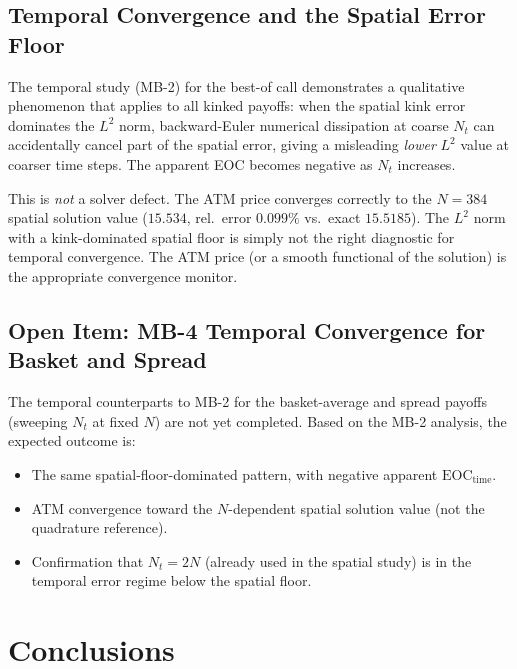 \documentclass[11pt,a4paper]{article}
\newcommand{\eoc}{\mathrm{EOC}}
\begin{document}
\subsection{Temporal Convergence and the Spatial Error Floor}

The temporal study (MB-2) for the best-of call demonstrates a qualitative
phenomenon that applies to all kinked payoffs: when the spatial kink error
dominates the $L^2$ norm, backward-Euler numerical dissipation at coarse
$N_t$ can accidentally cancel part of the spatial error, giving a misleading
\emph{lower} $L^2$ value at coarser time steps.  The apparent EOC becomes
negative as $N_t$ increases.

This is \emph{not} a solver defect.  The ATM price converges correctly to the
$N=384$ spatial solution value ($15.534$, rel.\ error $0.099\%$ vs.\ exact $15.5185$).
The $L^2$ norm with a kink-dominated spatial floor is simply not the right
diagnostic for temporal convergence.  The ATM price (or a smooth functional
of the solution) is the appropriate convergence monitor.

\subsection{Open Item: MB-4 Temporal Convergence for Basket and Spread}

The temporal counterparts to MB-2 for the basket-average and spread payoffs
(sweeping $N_t$ at fixed $N$) are not yet completed.  Based on the MB-2
analysis, the expected outcome is:
\begin{itemize}
  \item The same spatial-floor-dominated pattern, with negative apparent
        $\eoc_{\text{time}}$.
  \item ATM convergence toward the $N$-dependent spatial solution value
        (not the quadrature reference).
  \item Confirmation that $N_t = 2N$ (already used in the spatial study)
        is in the temporal error regime below the spatial floor.
\end{itemize}

\section{Conclusions}
\label{sec:conclusions}
\end{document}
